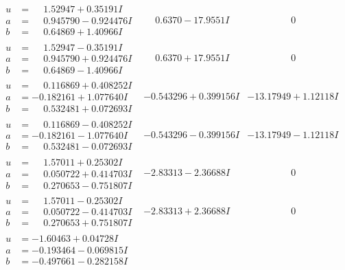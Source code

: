 \documentclass[1p]{elsarticle_modified}
\theoremstyle{definition}
\begin{document}
$$\begin{array}{c|c|c}
\begin{aligned}
u &= \phantom{-}1.52947 + 0.35191 I \\
a &= \phantom{-}0.945790 - 0.924476 I \\
b &= \phantom{-}0.64869 + 1.40966 I\end{aligned}
 & \phantom{-}0.6370 - 17.9551 I & \phantom{-0.000000 } 0 \\ \hline\begin{aligned}
u &= \phantom{-}1.52947 - 0.35191 I \\
a &= \phantom{-}0.945790 + 0.924476 I \\
b &= \phantom{-}0.64869 - 1.40966 I\end{aligned}
 & \phantom{-}0.6370 + 17.9551 I & \phantom{-0.000000 } 0 \\ \hline\begin{aligned}
u &= \phantom{-}0.116869 + 0.408252 I \\
a &= -0.182161 + 1.077640 I \\
b &= \phantom{-}0.532481 + 0.072693 I\end{aligned}
 & -0.543296 + 0.399156 I & -13.17949 + 1.12118 I \\ \hline\begin{aligned}
u &= \phantom{-}0.116869 - 0.408252 I \\
a &= -0.182161 - 1.077640 I \\
b &= \phantom{-}0.532481 - 0.072693 I\end{aligned}
 & -0.543296 - 0.399156 I & -13.17949 - 1.12118 I \\ \hline\begin{aligned}
u &= \phantom{-}1.57011 + 0.25302 I \\
a &= \phantom{-}0.050722 + 0.414703 I \\
b &= \phantom{-}0.270653 - 0.751807 I\end{aligned}
 & -2.83313 - 2.36688 I & \phantom{-0.000000 } 0 \\ \hline\begin{aligned}
u &= \phantom{-}1.57011 - 0.25302 I \\
a &= \phantom{-}0.050722 - 0.414703 I \\
b &= \phantom{-}0.270653 + 0.751807 I\end{aligned}
 & -2.83313 + 2.36688 I & \phantom{-0.000000 } 0 \\ \hline\begin{aligned}
u &= -1.60463 + 0.04728 I \\
a &= -0.193464 - 0.069815 I \\
b &= -0.497661 - 0.282158 I\end{aligned}

\end{array}$$
\end{document}
